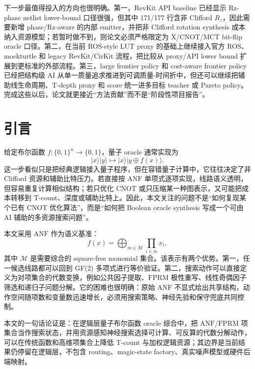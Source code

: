 \documentclass[UTF8,fontset=macnew,11pt]{ctexart}
\newcommand{\anf}{\ensuremath{\mathrm{ANF}}}
\newcommand{\fprm}{\ensuremath{\mathrm{FPRM}}}
\newcommand{\xor}{\ensuremath{\oplus}}
\begin{document}
下一步最值得投入的方向也很明确。第一，RevKit API baseline 已经显示 Rz-phase netlist lower-bound 口径很强，但其中 171/177 行含非 Clifford $R_z$，因此需要新增 phase/Rz-aware 的内部 emitter，并把非 Clifford rotation synthesis 成本纳入资源模型；若暂时做不到，则论文必须严格限定为 X/CNOT/MCT bit-flip oracle 口径。第二，在当前 ROS-style LUT proxy 的基础上继续接入官方 ROS、mockturtle 和 legacy RevKit/CirKit 流程，把比较从 proxy/API lower bound 扩展到更标准的外部流程。第三，large frontier policy 和 cost-aware frontier policy 已经把结构级 AI 从单一质量追求推进到可调质量-时间折中，但还可以继续把辅助线生命周期、T-depth proxy 和 score 统一进多目标 teacher 或 Pareto policy。完成这些以后，论文就更接近“方法贡献”而不是“阶段性项目报告”。

\section{引言}

给定布尔函数 $f:\{0,1\}^n\rightarrow\{0,1\}$，量子 oracle 通常实现为
\begin{equation}
  |x\rangle |y\rangle \mapsto |x\rangle |y\xor f(x)\rangle .
  \label{eq:oracle}
\end{equation}
这一步看似只是把经典逻辑接入量子程序，但在容错量子计算中，它往往决定了非 Clifford 资源和辅助比特压力。若直接按 \anf{} 单项式逐项实现，线路语义透明，但容易重复计算相似结构；若只优化 CNOT 或只压缩某一种图表示，又可能把成本转移到 T-count、深度或辅助比特上。因此，本文关注的问题不是“如何复现某个已有 CNOT 优化算法”，而是“如何把 Boolean oracle synthesis 写成一个可由 AI 辅助的多资源搜索问题”。

本文采用 \anf{} 作为语义基准：
\begin{equation}
  f(x)=\bigoplus_{m\in\mathcal{M}}\prod_{i\in m}x_i ,
  \label{eq:anf}
\end{equation}
其中 $\mathcal{M}$ 是需要综合的 square-free monomial 集合。该表示有两个优势。第一，任一候选线路都可以回到 GF(2) 多项式进行等价验证。第二，搜索动作可以直接定义为对项集合的代数变换，例如公共因子提取、\fprm{} 极性重写、线性奇偶因子筛选和递归子问题分解。它的困难也很明确：原始 \anf{} 不显式给出共享结构，动作空间随项数和变量数迅速增长，必须用搜索策略、神经先验和保守兜底共同控制。

本文的一句话论证是：在逻辑层量子布尔函数 oracle 综合中，把 \anf{}/\fprm{} 项集合当作搜索状态，并用资源感知神经搜索选择可计算、可反算的代数分解动作，可以在传统函数和高维项集合上降低 T-count 与加权逻辑资源；其边界是当前结果仍停留在逻辑层，不包含 routing、magic-state factory、真实噪声模型或硬件后端映射。
\end{document}
